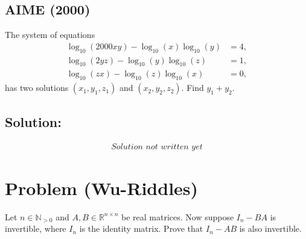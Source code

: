 \documentclass[11pt, a4paper, oneside]{article}
\newcommand{\problem}[1][]{\section{#1} \hfill \par}
\newcommand{\solution}[1][]{\subsection*{#1}\hfill \par}
\theoremstyle{remark}
\theoremstyle{lemma}
\begin{document}
\subsection{AIME (2000)} 
The system of equations
\begin{align*}
\log_{10}(2000xy) - \log_{10}\left(x\right)\log_{10}\left(y\right) &= 4, \\
\log_{10}(2yz) - \log_{10}\left(y\right)\log_{10}\left(z\right) &= 1, \\
\log_{10}(zx) - \log_{10}\left(z\right)\log_{10}\left(x\right) &= 0,
\end{align*}
has two solutions \( (x_{1},y_{1},z_{1}) \) and \( (x_{2},y_{2},z_{2}) \). Find \( y_{1} + y_{2} \).
\solution[Solution:]
\[
\substack{\textit{Solution not written yet}}
\]

\newpage
\problem[Problem (Wu-Riddles)]
Let \( n \in \mathbb{N}_{>0} \) and \( A, B \in \mathbb{R}^{n \times n} \) be real matrices. Now suppose \( I_n - BA \) is invertible, where \( I_n \) is the identity matrix. Prove that \( I_n - AB \) is also invertible.
\end{document}
